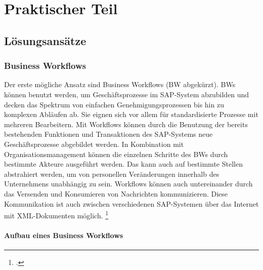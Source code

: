 \chapter{Praktischer Teil}


\section{Lösungsansätze}


\subsection{Business Workflows}

Der erste mögliche Ansatz sind Business Workflows (BW abgekürzt). BWs können benutzt werden, um Geschäftsprozesse im SAP-System abzubilden und decken das Spektrum von einfachen Genehmigungsprozessen bis hin zu komplexen Abläufen ab. Sie eignen sich vor allem für standardisierte Prozesse mit mehreren Bearbeitern.
Mit Workflows können durch die Benutzung der bereits bestehenden Funktionen und Transaktionen des SAP-Systems neue Geschäftsprozesse abgebildet werden.
In Kombination mit Organisationsmanagement können die einzelnen Schritte des BWs durch bestimmte Akteure ausgeführt werden. Das kann auch auf bestimmte Stellen abstrahiert werden, um von personellen Veränderungen innerhalb des Unternehmens unabhängig zu sein. Workflows können auch untereinander durch das Versenden und Konsumieren von Nachrichten kommunizieren. Diese Kommunikation ist auch zwischen verschiedenen SAP-Systemen über das Internet mit XML-Dokumenten möglich. \footcite[Vgl.][]{sap_business-workflows_2022-1}

\subsubsection{Aufbau eines Business Workflows}

